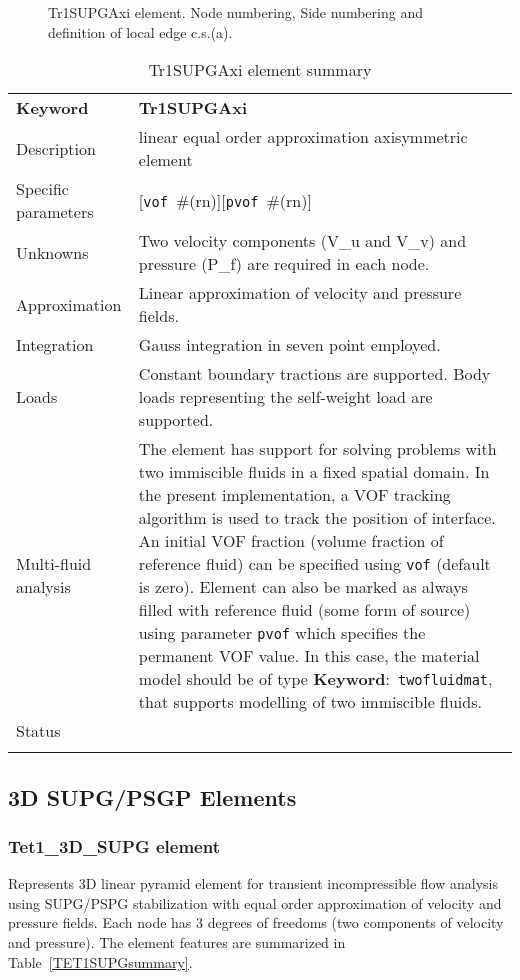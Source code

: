\documentclass[a4paper]{article}
\newcommand{\descitem}[1]{{\noindent \textbf{#1}}:}
\newcommand{\elemkeyword}[1]{\descitem{Keyword}~\param{#1}} %
\newcommand{\param}[1]{\texttt{#1}} %
\newcommand{\optional}[1]{[#1]} %
\newcommand{\field}[2]{\param{#1}~\#{\tiny(#2)}} %
\newcommand{\optField}[2]{\optional{\field{#1}{#2}}}
\newcommand{\templabel}{}%
\newcommand{\tempcaption}{}%
\newcounter{nelpar}
\newenvironment{elementsummary}[5]{%
  \gdef\tempcaption{#4}%
  \gdef\templabel{#5}%
  \setcounter{nelpar}{0}%
  \begin{center} %
    \begin{table}[!htb] %
      \begin{tabular}{|l|p{9cm}|}\hline %
        {\bf Keyword} & \bf{#1}\\ %
        {Description} & {#2}\\ %
        {Specific parameters} & {#3}\\ \hline %
}{
  \\ \hline %
      \end{tabular}%
      \caption{\tempcaption}%
      \label{\templabel}%
    \end{table}%
  \end{center}%
}
\newcommand{\elementDescription}[2]{{#1} & {#2}\\ }
\begin{document}
\begin{figure}[htb]
 \centering
 \begin{makeimage}
  
 \end{makeimage}
 \caption{Tr1SUPGAxi element. Node numbering, Side numbering and
 definition of local edge c.s.(a).}
 \label{Tr1SUPGAxifig}
\end{figure}

\begin{elementsummary}{Tr1SUPGAxi}{linear equal order approximation axisymmetric element}
  {\optField{vof}{rn}\optField{pvof}{rn}}{Tr1SUPGAxi element summary}{Tr1SUPGAxisummary}
\elementDescription{Unknowns}{Two velocity components (V\_u and V\_v) and pressure (P\_f) are required in each node.}
\elementDescription{Approximation}{Linear approximation of velocity and pressure fields.}
\elementDescription{Integration}{Gauss integration in seven point employed.}
\elementDescription{Loads}{Constant boundary tractions are supported. Body loads
representing the self-weight load are supported.}
\elementDescription{Multi-fluid analysis}{The element has support for solving
problems with two immiscible fluids in
a fixed spatial domain. In the present implementation, a VOF tracking algorithm
is used to track the position of interface. An initial VOF fraction
(volume fraction of reference fluid) can be specified using
\param{vof} (default is zero). Element can also be marked as always
filled with reference fluid (some form of source) using parameter
\param{pvof} which specifies the permanent VOF value. In this case,
the material model should be of type \elemkeyword{twofluidmat}, that
supports modelling of two immiscible fluids.}
\elementDescription{Status}{}
\end{elementsummary}


\clearpage
\subsection{3D SUPG/PSGP Elements}
\subsubsection{Tet1\_3D\_SUPG element}
\label{PY1_3D_SUPG}
Represents 3D linear pyramid element for transient
incompressible flow analysis using SUPG/PSPG stabilization with equal order
approximation of velocity and pressure fields. Each node has 3 degrees
of freedoms (two components of velocity and pressure). The element features are summarized in Table~\ref{TET1SUPGsummary}.
\end{document}
